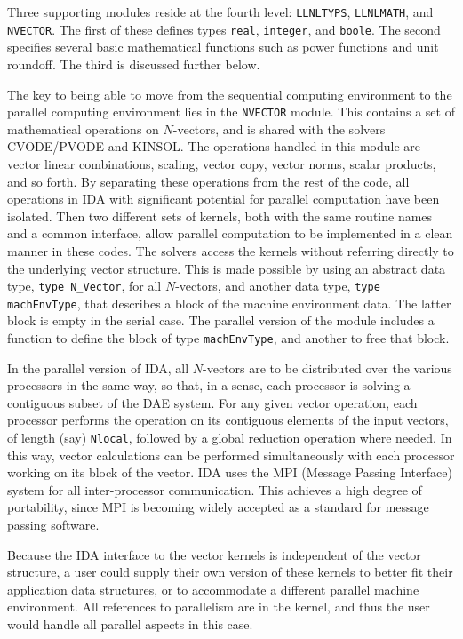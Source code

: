 Three supporting modules reside at the fourth level: {\tt LLNLTYPS},
{\tt LLNLMATH}, and {\tt NVECTOR}.  The first of these defines types
{\tt real}, {\tt integer}, and {\tt boole}.  The second specifies
several basic mathematical functions such as power functions and unit
roundoff.  The third is discussed further below.

The key to being able to move from the sequential computing
environment to the parallel computing environment lies in the 
{\tt NVECTOR} module.  This contains a set of mathematical operations
on $N$-vectors, and is shared with the solvers CVODE/PVODE and KINSOL.
The operations handled in this module are vector linear combinations,
scaling, vector copy, vector norms, scalar products, and so forth.  By
separating these operations from the rest of the code, all operations
in IDA with significant potential for parallel computation have been
isolated. Then two different sets of kernels, both with the same
routine names and a common interface, allow parallel computation to be
implemented in a clean manner in these codes.  The solvers access
the kernels without referring directly to the underlying vector
structure.  This is made possible by using an abstract data type, 
{\tt type N\_Vector}, for all $N$-vectors, and another data type, 
{\tt type machEnvType}, that describes a block of the machine
environment data.  The latter block is empty in the serial case.  The
parallel version of the module includes a function to define the block
of type {\tt machEnvType}, and another to free that block.

In the parallel version of IDA, all $N$-vectors are to be distributed
over the various processors in the same way, so that, in a sense, each
processor is solving a contiguous subset of the DAE system.  For any
given vector operation, each processor performs the operation on its
contiguous elements of the input vectors, of length (say) 
{\tt Nlocal}, followed by a global reduction operation where needed.
In this way, vector calculations can be performed simultaneously with
each processor working on its block of the vector.  IDA uses the MPI
(Message Passing Interface) system \cite{MPI} for all inter-processor
communication. This achieves a high degree of portability, since MPI
is becoming widely accepted as a standard for message passing
software.

Because the IDA interface to the vector kernels is independent of the
vector structure, a user could supply their own version of these
kernels to better fit their application data structures, or to
accommodate a different parallel machine environment.  All references
to parallelism are in the kernel, and thus the user would handle all
parallel aspects in this case.

